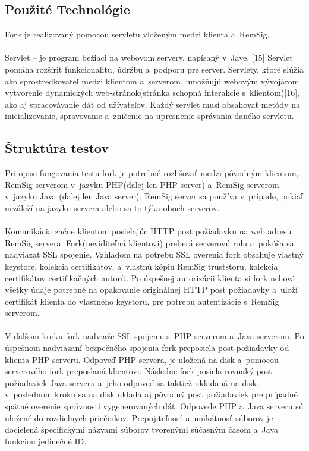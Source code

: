 \documentclass[
  printed, %
  notable,   %
  nolof,     %
    oneside,       %
  nolot,     %
]{fithesis3}
\begin{document}
\subsection{Použité Technológie}
Fork je realizovaný pomocou servletu vloženým medzi klienta a~RemSig.\paragraph{}
Servlet – je program bežiaci na webovom servery, napísaný v~Jave. [15]  Servlet pomáha rozšíriť  funkcionalitu, údržbu a~podporu pre server. Servlety, ktoré slúžia ako sprostredkovateľ medzi klientom a~serverom,  umožňujú webovým vývojárom vytvorenie dynamických web-stránok(stránka schopná interakcie s~klientom)[16], ako aj spracovávanie dát od užívateľov. Každý servlet musí obsahovať metódy na inicializovanie, spravovanie a~zničenie na upresnenie správania daného servletu.
\subsection{Štruktúra testov}
Pri opise fungovania testu fork je potrebné rozlišovať medzi pôvodným klientom, RemSig serverom v~jazyku PHP(ďalej len PHP server) a~RemSig serverom v~jazyku Java (ďalej len Java server). RemSig server sa používa v~prípade, pokiaľ nezáleží na jazyku servera alebo sa to týka oboch serverov. \paragraph{} 
Komunikácia začne klientom posielajúc HTTP post požiadavku na web adresu RemSig servera. Fork(neviditeľná klientovi) preberá serverovú rolu a~pokúša sa nadviazať SSL spojenie. Vzhľadom na potrebu SSL overenia fork  obsahuje vlastný keystore, kolekcia certifikátov, a~vlastnú kópiu RemSig truststoru, kolekcia certifikátov certifikačných autorít. Po úspešnej autorizácii klienta si fork uchová všetky údaje potrebné na opakovanie originálnej HTTP post požiadavky a~uloží certifikát klienta do vlastného keystoru, pre potrebu autentizácie s~RemSig serverom. \paragraph{}
V ďalšom kroku fork nadviaže SSL spojenie s~PHP serverom a~Java serverom. Po úspešnom nadviazaní bezpečného spojenia fork preposiela post požiadavky od klienta PHP serveru. Odpoveď PHP servera, je uložená na disk a~pomocou serverového fork preposlaná klientovi. Následne fork posiela rovnaký post požiadaviek Java serveru a~jeho odpoveď sa taktiež ukladaná na disk. v~poslednom kroku sa na disk ukladá aj pôvodný post požiadaviek pre prípadné spätné overenie správnosti vygenerovaných dát. Odpovede PHP a~Java serveru sú uložené do rozdielnych priečinkov. Prepojiteľnosť a~unikátnosť  súborov je docielená špecifickými názvami súborov tvorenými súčasným časom a~Java funkciou  jedinečné ID. 
\end{document}
